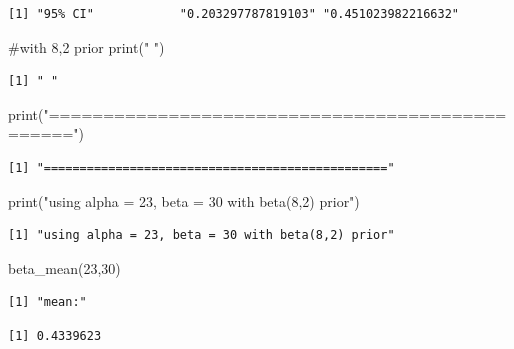 \documentclass[
  letterpaper,
  DIV=11,
  numbers=noendperiod]{scrartcl}
\newenvironment{Shaded}{\begin{snugshade}}{\end{snugshade}}
\newcommand{\CommentTok}[1]{\textcolor[rgb]{0.37,0.37,0.37}{#1}}
\newcommand{\DecValTok}[1]{\textcolor[rgb]{0.68,0.00,0.00}{#1}}
\newcommand{\FunctionTok}[1]{\textcolor[rgb]{0.28,0.35,0.67}{#1}}
\newcommand{\NormalTok}[1]{\textcolor[rgb]{0.00,0.23,0.31}{#1}}
\newcommand{\StringTok}[1]{\textcolor[rgb]{0.13,0.47,0.30}{#1}}
\begin{document}
\begin{verbatim}
[1] "95% CI"            "0.203297787819103" "0.451023982216632"
\end{verbatim}

\begin{Shaded}
\begin{Highlighting}[]
\CommentTok{\#with 8,2 prior }
\FunctionTok{print}\NormalTok{(}\StringTok{" "}\NormalTok{)}
\end{Highlighting}
\end{Shaded}

\begin{verbatim}
[1] " "
\end{verbatim}

\begin{Shaded}
\begin{Highlighting}[]
\FunctionTok{print}\NormalTok{(}\StringTok{"================================================"}\NormalTok{)}
\end{Highlighting}
\end{Shaded}

\begin{verbatim}
[1] "================================================"
\end{verbatim}

\begin{Shaded}
\begin{Highlighting}[]
\FunctionTok{print}\NormalTok{(}\StringTok{"using alpha = 23, beta = 30 with beta(8,2) prior"}\NormalTok{)}
\end{Highlighting}
\end{Shaded}

\begin{verbatim}
[1] "using alpha = 23, beta = 30 with beta(8,2) prior"
\end{verbatim}

\begin{Shaded}
\begin{Highlighting}[]
\FunctionTok{beta\_mean}\NormalTok{(}\DecValTok{23}\NormalTok{,}\DecValTok{30}\NormalTok{)}
\end{Highlighting}
\end{Shaded}

\begin{verbatim}
[1] "mean:"
\end{verbatim}

\begin{verbatim}
[1] 0.4339623
\end{verbatim}
\end{document}

